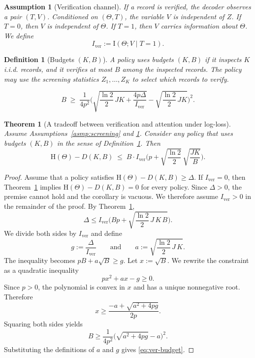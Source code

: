\documentclass[10pt,a4paper]{amsart}
\newtheorem{assumption}{Assumption}
\newtheorem{definition}{Definition}
\newtheorem{theorem}{Theorem}
\newcommand{\Hh}{\mathrm{H}}
\newcommand{\I}{\mathrm{I}}
\begin{document}
\begin{assumption}[Verification channel]
\label{asmp:verification-channel}
If a record is verified, the decoder observes a pair $(T,V)$.
Conditioned on $(\Theta,T)$, the variable $V$ is independent of $Z$.
If $T=0$, then $V$ is independent of $\Theta$.
If $T=1$, then $V$ carries information about $\Theta$.
We define
\begin{equation}
  I_{\mathrm{ver}}:=\I(\Theta;V\mid T=1).
  \label{eq:iver}
\end{equation}
\end{assumption}

\begin{definition}[Budgets $(K,B)$]
\label{def:budgets}
A policy uses budgets $(K,B)$ if it inspects $K$ i.i.d. records, and it verifies at most $B$ among the inspected records.
The policy may use the screening statistics $Z_1,\dots,Z_K$ to select which records to verify.
\end{definition}

\begin{equation}
\label{eq:ver-budget}
B \;\ge\;
\frac{1}{4p^2}
\Bigg(
\sqrt{\frac{\ln 2}{2}\,J K + \frac{4p\Delta}{I_{\mathrm{ver}}}}
-
\sqrt{\frac{\ln 2}{2}\,J K}
\Bigg)^2.
\end{equation}

\begin{theorem}[A tradeoff between verification and attention under log-loss]
\label{thm:ver-tradeoff}
Assume Assumptions~\ref{asmp:screening} and \ref{asmp:verification-channel}.
Consider any policy that uses budgets $(K,B)$ in the sense of Definition~\ref{def:budgets}.
Then
\begin{equation}
\label{eq:ver-tradeoff}
\Hh(\Theta)-D(K,B)
\;\le\;
B\cdot I_{\mathrm{ver}}\Bigg(
p + \sqrt{\frac{\ln 2}{2}}\,\sqrt{\frac{JK}{B}}
\Bigg).
\end{equation}
\end{theorem}

\begin{proof}
Assume that a policy satisfies $\Hh(\Theta)-D(K,B)\ge \Delta$.
If $I_{\mathrm{ver}}=0$, then Theorem~\ref{thm:ver-tradeoff} implies $\Hh(\Theta)-D(K,B)=0$ for every policy.
Since $\Delta>0$, the premise cannot hold and the corollary is vacuous.
We therefore assume $I_{\mathrm{ver}}>0$ in the remainder of the proof.
By Theorem~\ref{thm:ver-tradeoff},
\[
\Delta
\le
I_{\mathrm{ver}}\Bigg(Bp + \sqrt{\frac{\ln 2}{2}\,J\,K\,B}\Bigg).
\]
We divide both sides by $I_{\mathrm{ver}}$ and define
\[
g:=\frac{\Delta}{I_{\mathrm{ver}}}
\qquad\text{and}\qquad
a:=\sqrt{\frac{\ln 2}{2}\,J\,K}.
\]
The inequality becomes $pB+a\sqrt{B}\ge g$.
Let $x:=\sqrt{B}$.
We rewrite the constraint as a quadratic inequality
\[
p x^2 + a x - g \ge 0.
\]
Since $p>0$, the polynomial is convex in $x$ and has a unique nonnegative root.
Therefore
\[
x \ge \frac{-a+\sqrt{a^2+4pg}}{2p}.
\]
Squaring both sides yields
\[
B \ge \frac{1}{4p^2}\big(\sqrt{a^2+4pg}-a\big)^2.
\]
Substituting the definitions of $a$ and $g$ gives \eqref{eq:ver-budget}.
\end{proof}
\end{document}
